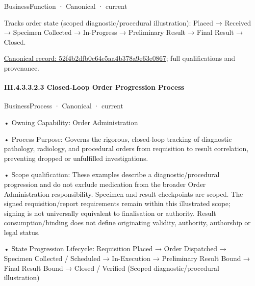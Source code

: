 \label{element:52f4b2dfb0c64e5aa4b378a9e63e0867}
{\small BusinessFunction · Canonical · current}\par

Tracks order state (scoped diagnostic/procedural illustration): Placed → Received → Specimen Collected → In-Progress → Preliminary Result → Final Result → Closed.


{\footnotesize \href{../../../../../../../../continuum/business/business-function/52f4b2dfb0c64e5aa4b378a9e63e0867.md}{Canonical record: 52f4b2dfb0c64e5aa4b378a9e63e0867}; full qualifications and provenance.}\par
\paragraph*{III.4.3.3.2.3 Closed-Loop Order Progression Process}
\label{navigation:III.4.3.3.2.3}

\label{element:e19a7c9594a4401e92450e4c31598982}
{\small BusinessProcess · Canonical · current}\par

•
Owning Capability: Order Administration



•
Process Purpose: Governs the rigorous, closed-loop tracking of diagnostic pathology, radiology, and procedural orders from requisition to result correlation, preventing dropped or unfulfilled investigations.



•
Scope qualification: These examples describe a diagnostic/procedural progression and do not exclude medication from the broader Order Administration responsibility. Specimen and result checkpoints are scoped. The signed requisition/report requirements remain within this illustrated scope; signing is not universally equivalent to finalisation or authority. Result consumption/binding does not define originating validity, authority, authorship or legal status.



•
State Progression Lifecycle: Requisition Placed → Order Dispatched → Specimen Collected / Scheduled → In-Execution → Preliminary Result Bound → Final Result Bound → Closed / Verified   (Scoped diagnostic/procedural illustration)



